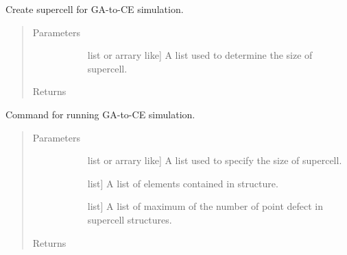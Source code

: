 \documentclass[letterpaper,10pt,english]{sphinxmanual}
\begin{document}
\begin{fulllineitems}
\label{\detokenize{pygace.scripts:pygace.scripts.rungace.build_supercell_template}}
Create supercell for GA-to-CE simulation.
\begin{quote}\begin{description}
\item[{Parameters}] \leavevmode\begin{description}
\item[{}] \leavevmode{[}list or arrary like{]}
A list used to determine the size of supercell.

\end{description}

\item[{Returns}] \leavevmode\begin{description}
\item[{}] \leavevmode
\end{description}

\end{description}\end{quote}

\end{fulllineitems}


\begin{fulllineitems}
\label{\detokenize{pygace.scripts:pygace.scripts.rungace.rungace}}
Command for running GA-to-CE simulation.
\begin{quote}\begin{description}
\item[{Parameters}] \leavevmode\begin{description}
\item[{}] \leavevmode{[}list or arrary like{]}
A list used to specify the size of supercell.

\item[{}] \leavevmode{[}list{]}
A list of elements contained in structure.

\item[{}] \leavevmode{[}list{]}
A list of maximum of the number of point defect in supercell structures.

\end{description}

\item[{Returns}] \leavevmode\begin{description}
\item[{}] \leavevmode
\end{description}

\end{description}\end{quote}

\end{fulllineitems}
\end{document}
